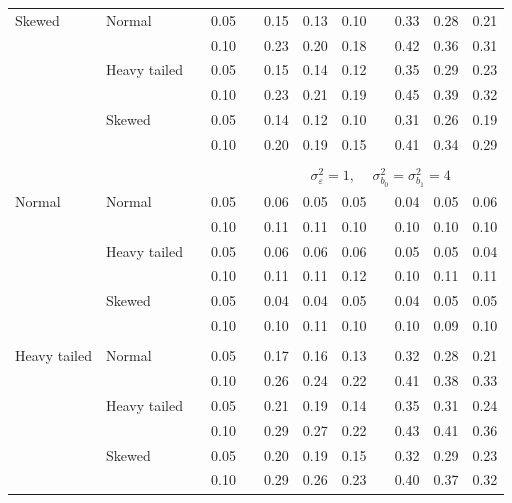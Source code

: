 \documentclass[12pt]{article} %
\begin{document}
\begin{table}[ht]
\begin{scriptsize}
\begin{center}
\begin{tabular}{ll p{.1cm} c p{.1cm} rrr p{.1cm} rrr}
Skewed       & Normal       && 0.05 &&  0.15 & 0.13 & 0.10 && 0.33 & 0.28 & 0.21 \\ 
             &              && 0.10 &&  0.23 & 0.20 & 0.18 && 0.42 & 0.36 & 0.31 \\ 
             & Heavy tailed && 0.05 &&  0.15 & 0.14 & 0.12 && 0.35 & 0.29 & 0.23 \\ 
             &              && 0.10 &&  0.23 & 0.21 & 0.19 && 0.45 & 0.39 & 0.32 \\ 
             & Skewed       && 0.05 &&  0.14 & 0.12 & 0.10 && 0.31 & 0.26 & 0.19 \\ 
             &              && 0.10 &&  0.20 & 0.19 & 0.15 && 0.41 & 0.34 & 0.29 \\ 


&&&&&&&&&&&\\
& && && \multicolumn{7}{c}{$\sigma_{\varepsilon}^2 = 1$, \ \ $\sigma_{b_0}^2 = \sigma_{b_1}^2 = 4$} \\ \cline{6-12}
\rowcolor{gray!20}Normal       & Normal       && 0.05 &&  0.06 & 0.05 & 0.05 && 0.04 & 0.05 & 0.06 \\ 
\rowcolor{gray!20}             &              && 0.10 &&  0.11 & 0.11 & 0.10 && 0.10 & 0.10 & 0.10 \\ 
\rowcolor{gray!20}             & Heavy tailed && 0.05 &&  0.06 & 0.06 & 0.06 && 0.05 & 0.05 & 0.04 \\ 
\rowcolor{gray!20}             &              && 0.10 &&  0.11 & 0.11 & 0.12 && 0.10 & 0.11 & 0.11 \\ 
\rowcolor{gray!20}             & Skewed       && 0.05 &&  0.04 & 0.04 & 0.05 && 0.04 & 0.05 & 0.05 \\ 
\rowcolor{gray!20}             &              && 0.10 &&  0.10 & 0.11 & 0.10 && 0.10 & 0.09 & 0.10 \\ 
             &&&&&&&&&&&\\
Heavy tailed & Normal       && 0.05 &&  0.17 & 0.16 & 0.13 && 0.32 & 0.28 & 0.21 \\ 
             &              && 0.10 &&  0.26 & 0.24 & 0.22 && 0.41 & 0.38 & 0.33 \\ 
             & Heavy tailed && 0.05 &&  0.21 & 0.19 & 0.14 && 0.35 & 0.31 & 0.24 \\ 
             &              && 0.10 &&  0.29 & 0.27 & 0.22 && 0.43 & 0.41 & 0.36 \\ 
             & Skewed       && 0.05 &&  0.20 & 0.19 & 0.15 && 0.32 & 0.29 & 0.23 \\ 
             &              && 0.10 &&  0.29 & 0.26 & 0.23 && 0.40 & 0.37 & 0.32 \\ 

\end{tabular}
\end{center}
\end{scriptsize}
\end{table}
\end{document}
